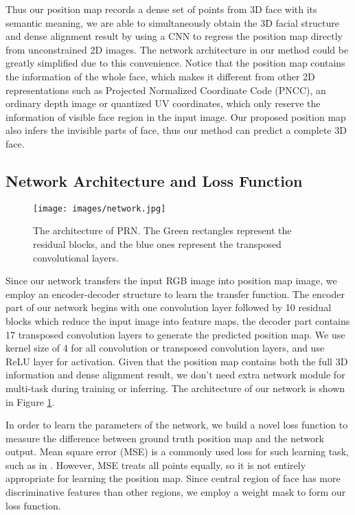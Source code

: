 \documentclass[runningheads]{llncs}
\begin{document}
Thus our position map records a dense set of points from 3D face with its semantic meaning, we are able to simultaneously obtain the 3D facial structure and dense alignment result by using a CNN to regress the position map directly from unconstrained 2D images. The network architecture in our method could be greatly simplified due to this convenience.
Notice that the position map contains the information of the whole face, which makes it different from other 2D representations such as Projected Normalized Coordinate Code (PNCC)\cite{zhu2016face,Richardson2016Learning}, an ordinary depth image\cite{Sela2017Unrestricted} or quantized UV coordinates\cite{guler2017densereg}, which only reserve the information of visible face region in the input image. Our proposed position map also infers the invisible parts of face, thus our method can predict a complete 3D face.



\subsection{Network Architecture and Loss Function}

\begin{figure}
\vspace{-3mm}
\centering
\texttt{[image: images/network.jpg]} 
\caption{The architecture of PRN. The Green rectangles represent the residual blocks, and the blue ones represent the transposed convolutional layers.}
\label{fig: network architecture}
\vspace{-5mm}
\end{figure}
Since our network transfers the input RGB image into position map image, we employ an encoder-decoder structure to learn the transfer function. 
The encoder part of our network begins with one convolution layer followed by 10 residual blocks\cite{He2016Deep} which reduce the  input image into  feature maps, the decoder part contains 17 transposed convolution layers to generate the predicted  position map. 
We use kernel size of 4 for all convolution or transposed convolution layers, and use ReLU layer for activation.
Given that the position map contains both the full 3D information and dense alignment result, we don't need extra network module for multi-task during training or inferring.
The architecture of our network is shown in Figure \ref{fig: network architecture}. 

In order to learn the parameters of the network, we build a novel loss function to measure the difference between ground truth position map and the network output. Mean square error (MSE) is a commonly used loss for such learning task, such as in \cite{Yu2017Learning,Crispell2017Pix2face}. However, MSE treats all points equally, so it is not entirely appropriate for learning the position map. Since central region of face has more discriminative features than other regions, we employ a weight mask to form our loss function.
\end{document}

